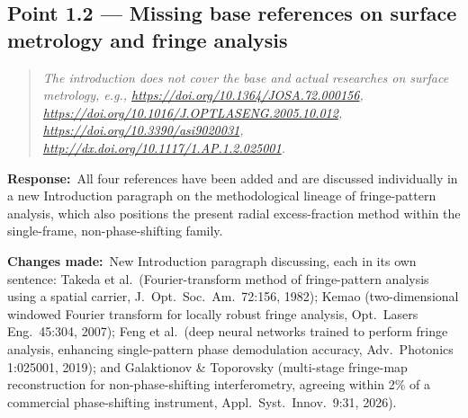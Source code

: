 \documentclass[11pt,a4paper]{article}
\newenvironment{reviewercomment}%
{\par\medskip\noindent\begin{quotation}\itshape\color{black!70}}%
{\end{quotation}\medskip}
\newcommand{\response}{\par\noindent\textbf{Response:}\ }
\newcommand{\changes}{\par\noindent\textbf{Changes made:}\ }
\begin{document}
\subsection*{Point 1.2 --- Missing base references on surface metrology and fringe analysis}
\begin{reviewercomment}
The introduction does not cover the base and actual researches on surface metrology, e.g., \url{https://doi.org/10.1364/JOSA.72.000156}, \url{https://doi.org/10.1016/J.OPTLASENG.2005.10.012}, \url{https://doi.org/10.3390/asi9020031}, \url{http://dx.doi.org/10.1117/1.AP.1.2.025001}.
\end{reviewercomment}
\response All four references have been added and are discussed individually in a new Introduction paragraph on the methodological lineage of fringe-pattern analysis, which also positions the present radial excess-fraction method within the single-frame, non-phase-shifting family.
\changes New Introduction paragraph discussing, each in its own sentence: Takeda et al.\ (Fourier-transform method of fringe-pattern analysis using a spatial carrier, J.~Opt.~Soc.~Am.\ 72:156, 1982); Kemao (two-dimensional windowed Fourier transform for locally robust fringe analysis, Opt.\ Lasers Eng.\ 45:304, 2007); Feng et al.\ (deep neural networks trained to perform fringe analysis, enhancing single-pattern phase demodulation accuracy, Adv.\ Photonics 1:025001, 2019); and Galaktionov \& Toporovsky (multi-stage fringe-map reconstruction for non-phase-shifting interferometry, agreeing within 2\% of a commercial phase-shifting instrument, Appl.\ Syst.\ Innov.\ 9:31, 2026).
\end{document}
